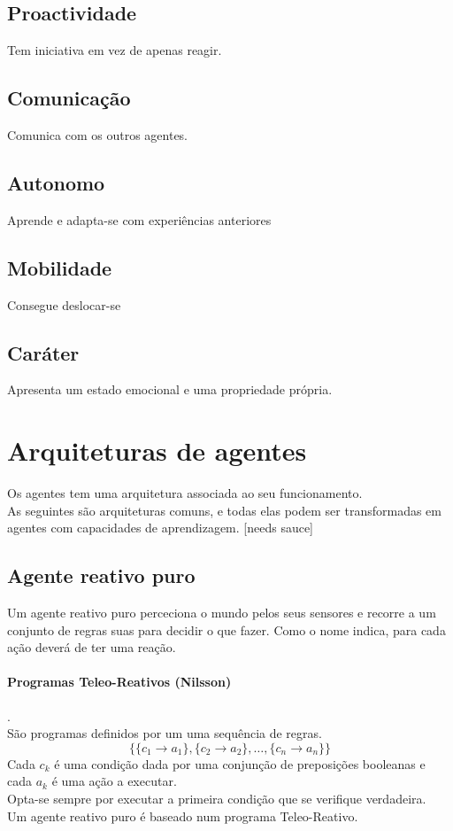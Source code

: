 \documentclass[]{report}
\begin{document}
\subsection{Proactividade}
Tem iniciativa em vez de apenas reagir.
\subsection{Comunicação}
Comunica com os outros agentes.
\subsection{Autonomo}
Aprende e adapta-se com experiências anteriores
\subsection{Mobilidade}
Consegue deslocar-se
\subsection{Caráter}
Apresenta um estado emocional e uma propriedade própria.
\clearpage
\section{Arquiteturas de agentes}
Os agentes tem uma arquitetura associada ao seu funcionamento.\\
As seguintes são arquiteturas comuns, e todas elas podem ser transformadas em agentes com capacidades de aprendizagem. [needs sauce]
\subsection{Agente reativo puro}
Um agente reativo puro perceciona o mundo pelos seus sensores e recorre a um conjunto de regras suas para decidir o que fazer. Como o nome indica, para cada ação deverá de ter uma reação.
\paragraph{Programas Teleo-Reativos (Nilsson)}.\\
São programas definidos por um uma sequência de regras.
$$\{\{c_1 \rightarrow a_1\}, \{c_2 \rightarrow a_2\}, \dots, \{c_n \rightarrow a_n\}\}$$
Cada $c_k$ é uma condição dada por uma conjunção de preposições booleanas e cada $a_k$ é uma ação a executar.\\
Opta-se sempre por executar a primeira condição que se verifique verdadeira.\\[2mm]
Um agente reativo puro é baseado num programa Teleo-Reativo.
\end{document}
